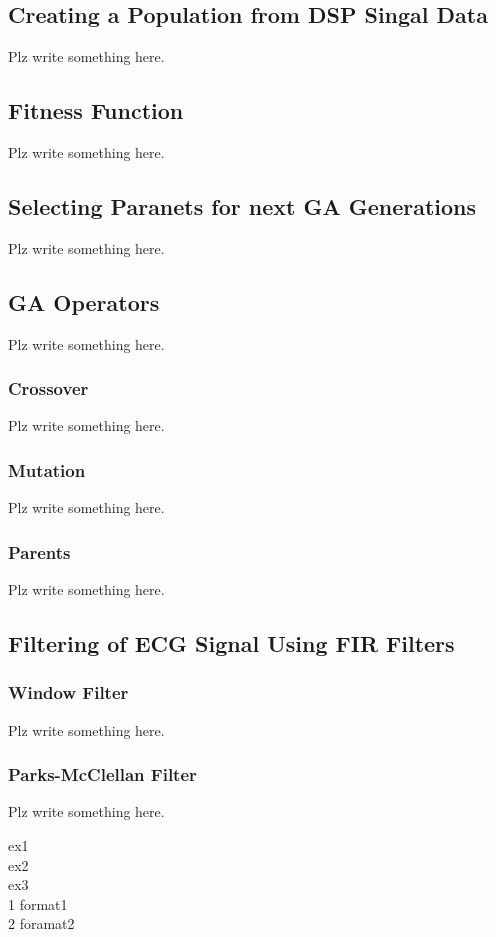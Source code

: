 \documentclass[a4paper, 12pt]{article}
\begin{document}
    \subsection{Creating a Population from DSP Singal Data}\label{sec:meth_sub1}
        Plz write something here.
    \subsection{Fitness Function}\label{sec:meth_sub2}
        Plz write something here.
    \subsection{Selecting Paranets for next GA Generations}\label{sec:meth_sub3}
        Plz write something here.
    \subsection{GA Operators}\label{sec:meth_sub4}
        Plz write something here.
        \subsubsection{Crossover}
            Plz write something here.
        \subsubsection{Mutation}
            Plz write something here.
        \subsubsection{Parents}
            Plz write something here.
    \subsection{Filtering of ECG Signal Using FIR Filters}\label{sec:meth_sub5}
        \subsubsection{Window Filter}
            Plz write something here.
        \subsubsection{Parks-McClellan Filter}
            Plz write something here.
    
    \begin{flushleft}
        ex1\\
        ex2\\
        ex3\\
        1 format1\\
        2 foramat2\\
    \end{flushleft}
\end{document}
